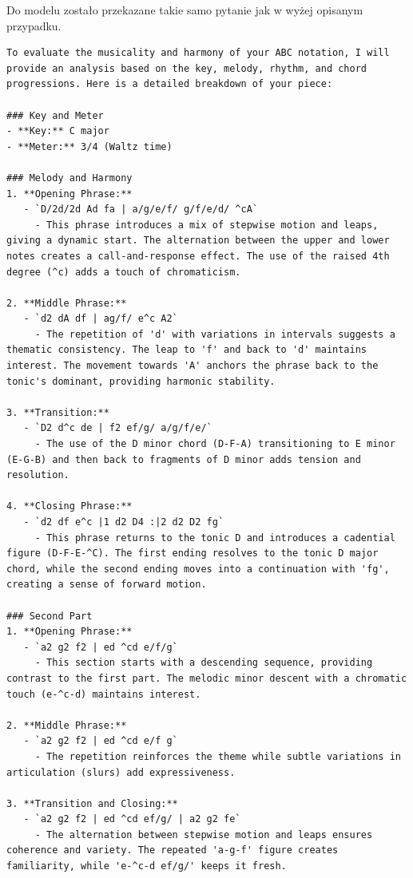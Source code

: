 \documentclass[data-science]{agh-wi} %
\begin{document}
Do modelu zostało przekazane takie samo pytanie jak w wyżej opisanym przypadku.
\begin{verbatim}
To evaluate the musicality and harmony of your ABC notation, I will provide an analysis based on the key, melody, rhythm, and chord progressions. Here is a detailed breakdown of your piece:

### Key and Meter
- **Key:** C major
- **Meter:** 3/4 (Waltz time)

### Melody and Harmony
1. **Opening Phrase:**
   - `D/2d/2d Ad fa | a/g/e/f/ g/f/e/d/ ^cA`
     - This phrase introduces a mix of stepwise motion and leaps, giving a dynamic start. The alternation between the upper and lower notes creates a call-and-response effect. The use of the raised 4th degree (^c) adds a touch of chromaticism.

2. **Middle Phrase:**
   - `d2 dA df | ag/f/ e^c A2`
     - The repetition of 'd' with variations in intervals suggests a thematic consistency. The leap to 'f' and back to 'd' maintains interest. The movement towards 'A' anchors the phrase back to the tonic's dominant, providing harmonic stability.

3. **Transition:**
   - `D2 d^c de | f2 ef/g/ a/g/f/e/`
     - The use of the D minor chord (D-F-A) transitioning to E minor (E-G-B) and then back to fragments of D minor adds tension and resolution.

4. **Closing Phrase:**
   - `d2 df e^c |1 d2 D4 :|2 d2 D2 fg`
     - This phrase returns to the tonic D and introduces a cadential figure (D-F-E-^C). The first ending resolves to the tonic D major chord, while the second ending moves into a continuation with 'fg', creating a sense of forward motion.

### Second Part
1. **Opening Phrase:**
   - `a2 g2 f2 | ed ^cd e/f/g`
     - This section starts with a descending sequence, providing contrast to the first part. The melodic minor descent with a chromatic touch (e-^c-d) maintains interest.

2. **Middle Phrase:**
   - `a2 g2 f2 | ed ^cd e/f g`
     - The repetition reinforces the theme while subtle variations in articulation (slurs) add expressiveness.

3. **Transition and Closing:**
   - `a2 g2 f2 | ed ^cd ef/g/ | a2 g2 fe`
     - The alternation between stepwise motion and leaps ensures coherence and variety. The repeated 'a-g-f' figure creates familiarity, while 'e-^c-d ef/g/' keeps it fresh.


\end{verbatim}
\end{document}

